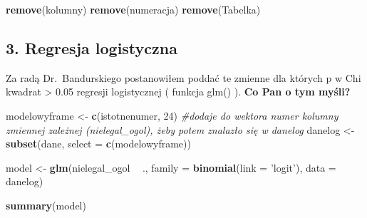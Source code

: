 \documentclass[]{article}
\newenvironment{Shaded}{\begin{snugshade}}{\end{snugshade}}
\newcommand{\KeywordTok}[1]{\textcolor[rgb]{0.13,0.29,0.53}{\textbf{#1}}}
\newcommand{\DataTypeTok}[1]{\textcolor[rgb]{0.13,0.29,0.53}{#1}}
\newcommand{\DecValTok}[1]{\textcolor[rgb]{0.00,0.00,0.81}{#1}}
\newcommand{\StringTok}[1]{\textcolor[rgb]{0.31,0.60,0.02}{#1}}
\newcommand{\CommentTok}[1]{\textcolor[rgb]{0.56,0.35,0.01}{\textit{#1}}}
\newcommand{\OperatorTok}[1]{\textcolor[rgb]{0.81,0.36,0.00}{\textbf{#1}}}
\newcommand{\NormalTok}[1]{#1}
\begin{document}
\begin{Shaded}
\begin{Highlighting}[]
\KeywordTok{remove}\NormalTok{(kolumny)}
\KeywordTok{remove}\NormalTok{(numeracja)}
\KeywordTok{remove}\NormalTok{(Tabelka)}
\end{Highlighting}
\end{Shaded}

\subsection{3. Regresja logistyczna}\label{regresja-logistyczna}

Za radą Dr.~Bandurskiego postanowiłem poddać te zmienne dla których p w
Chi kwadrat \textgreater{} 0.05 regresji logistycznej ( funkcja glm() ).
\textbf{Co Pan o tym myśli?}

\begin{Shaded}
\begin{Highlighting}[]
\NormalTok{modelowyframe <-}\StringTok{ }\KeywordTok{c}\NormalTok{(istotnenumer, }\DecValTok{24}\NormalTok{) }\CommentTok{#dodaje do wektora numer kolumny zmiennej zależnej (nielegal_ogol), żeby potem znalazło się w danelog}
\NormalTok{danelog <-}\StringTok{ }\KeywordTok{subset}\NormalTok{(dane, }\DataTypeTok{select =} \KeywordTok{c}\NormalTok{(modelowyframe))}

\NormalTok{model <-}
\StringTok{  }\KeywordTok{glm}\NormalTok{(nielegal_ogol }\OperatorTok{~}\StringTok{ }\NormalTok{.,}
      \DataTypeTok{family =} \KeywordTok{binomial}\NormalTok{(}\DataTypeTok{link =} \StringTok{'logit'}\NormalTok{),}
      \DataTypeTok{data =}\NormalTok{ danelog)}

\KeywordTok{summary}\NormalTok{(model)}
\end{Highlighting}
\end{Shaded}
\end{document}
